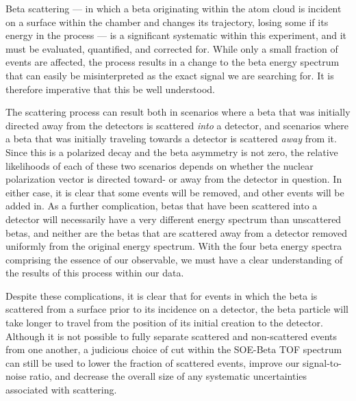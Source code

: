 %
	Beta scattering --- in which a beta originating within the atom cloud is incident on a surface within the chamber and changes its trajectory, losing some if its energy in the process --- is a significant systematic within this experiment, and it must be evaluated, quantified, and corrected for.  While only a small fraction of events are affected, the process results in a change to the beta energy spectrum that can easily be misinterpreted as the exact signal we are searching for.  It is therefore imperative that this be well understood. 

The scattering process can result both in scenarios where a beta that was initially directed away from the detectors is scattered \emph{into} a detector, and scenarios where a beta that was initially traveling towards a detector is scattered \emph{away} from it. Since this is a polarized decay and the beta asymmetry is not zero, the relative likelihoods of each of these two scenarios depends on whether the nuclear polarization vector is directed toward- or away from the detector in question.  In either case, it is clear that some events will be removed, and other events will be added in.  As a further complication, betas that have been scattered into a detector will necessarily have a very different energy spectrum than unscattered betas, and neither are the betas that are scattered away from a detector removed uniformly from the original energy spectrum.  With the four beta energy spectra comprising the essence of our observable, we must have a clear understanding of the results of this process within our data.

Despite these complications, it is clear that for events in which the beta is scattered from a surface prior to its incidence on a detector, the beta particle will take longer to travel from the position of its initial creation to the detector.  Although it is not possible to fully separate scattered and non-scattered events from one another, a judicious choice of cut within the SOE-Beta TOF spectrum can still be used to lower the fraction of scattered events, improve our signal-to-noise ratio, and decrease the overall size of any systematic uncertainties associated with scattering.

